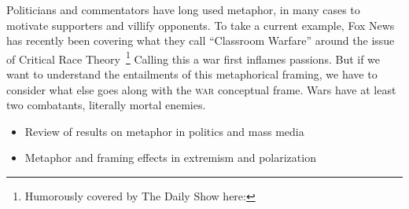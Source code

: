 \documentclass[12pt,letterpaper]{article}
\begin{document}
Politicians and commentators have long used metaphor, in many cases to motivate
supporters and villify opponents. To take a current example, Fox News has
recently been covering what they call ``Classroom Warfare'' around the issue
of Critical Race Theory~\footnote{Humorously covered by The Daily Show here:}
Calling this a war first inflames passions. But if we want to understand the
entailments of this metaphorical framing, we have to consider what else goes
along with the \textsc{war} conceptual frame. Wars have at least two combatants,
literally mortal enemies. 
\begin{itemize}
  \item
    Review of results on metaphor in politics and mass media~\cite{Lakoff1991,Charteris-Black2009,Burnes2011,Flusberg2017,Flusberg2017a,Flusberg2018,Burgers2019}
  \item
    Metaphor and framing effects in extremism and polarization~\cite{Flusberg2017,Flusberg2018,Kalmoe2014,Kalmoe2018}
\end{itemize}




\end{document}
